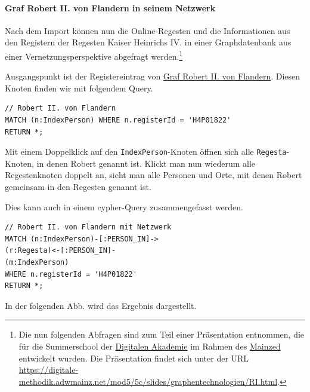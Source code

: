 \documentclass[12pt,ngerman,]{article}
\let\oldparagraph\paragraph
\renewcommand{\paragraph}[1]{\oldparagraph{#1}\mbox{}}
\begin{document}
\paragraph{Graf Robert II. von Flandern in seinem
Netzwerk}\label{graf-robert-ii.-von-flandern-in-seinem-netzwerk}

Nach dem Import können nun die Online-Regesten und die Informationen aus
den Registern der Regesten Kaiser Heinrichs IV. in einer Graphdatenbank
aus einer Vernetzungsperspektive abgefragt werden.\footnote{Die nun
  folgenden Abfragen sind zum Teil einer Präsentation entnommen, die für
  die Summerschool der \href{https://www.digitale-akademie.de}{Digitalen
  Akademie} im Rahmen des \href{https://www.mainzed.org/de}{Mainzed}
  entwickelt wurden. Die Präsentation findet sich unter der URL
  \url{https://digitale-methodik.adwmainz.net/mod5/5c/slides/graphentechnologien/RI.html}.}

Ausgangspunkt ist der Registereintrag von
\href{https://de.wikipedia.org/wiki/Robert_II._(Flandern)}{Graf Robert
II. von Flandern}. Diesen Knoten finden wir mit folgendem Query.

\begin{verbatim}
// Robert II. von Flandern
MATCH (n:IndexPerson) WHERE n.registerId = 'H4P01822'
RETURN *;
\end{verbatim}

Mit einem Doppelklick auf den \texttt{IndexPerson}-Knoten öffnen sich
alle \texttt{Regesta}-Knoten, in denen Robert genannt ist. Klickt man
nun wiederum alle Regestenknoten doppelt an, sieht man alle Personen und
Orte, mit denen Robert gemeinsam in den Regesten genannt ist.

Dies kann auch in einem cypher-Query zusammengefasst werden.

\begin{verbatim}
// Robert II. von Flandern mit Netzwerk
MATCH (n:IndexPerson)-[:PERSON_IN]->
(r:Regesta)<-[:PERSON_IN]-
(m:IndexPerson)
WHERE n.registerId = 'H4P01822'
RETURN *;
\end{verbatim}

In der folgenden Abb. wird das Ergebnis dargestellt.
\end{document}
